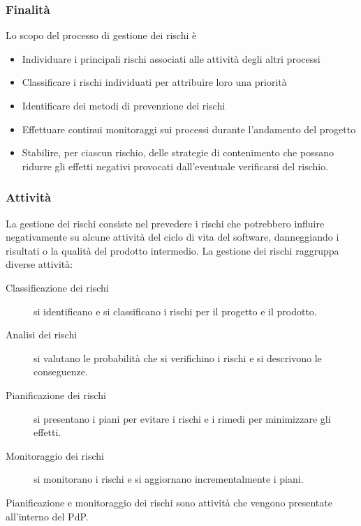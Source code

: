 \documentclass[../../norme-di-progetto.tex]{subfiles}
\begin{document}
\subsubsection{Finalità}%
\label{subs:gestione_dei_rischi/finalita}
Lo scopo del processo di gestione dei rischi è
\begin{itemize}
  \item Individuare i principali rischi associati alle attività degli altri processi
  \item Classificare i rischi individuati per attribuire loro una priorità
  \item Identificare dei metodi di prevenzione dei rischi
  \item Effettuare continui monitoraggi sui processi durante l'andamento del progetto
  \item Stabilire, per ciascun rischio, delle strategie di contenimento che possano ridurre gli effetti negativi provocati dall'eventuale verificarsi del rischio.
\end{itemize}

\subsubsection{Attività}%
\label{subs:attivita}
La gestione dei rischi consiste nel prevedere i rischi che potrebbero influire negativamente su alcune attività del ciclo di vita del software, danneggiando i risultati o la qualità del prodotto intermedio.
La gestione dei rischi raggruppa diverse attività:

\begin{description}
  \item [Classificazione dei rischi] si identificano e si classificano i rischi per il progetto e il prodotto.
  \item [Analisi dei rischi] si valutano le probabilità che si verifichino i rischi e si descrivono le conseguenze.
  \item [Pianificazione dei rischi] si presentano i piani per evitare i rischi e i rimedi per minimizzare gli effetti.
  \item [Monitoraggio dei rischi] si monitorano i rischi e si aggiornano incrementalmente i piani.
\end{description}

Pianificazione e monitoraggio dei rischi sono attività che vengono presentate all'interno del PdP.
\end{document}
